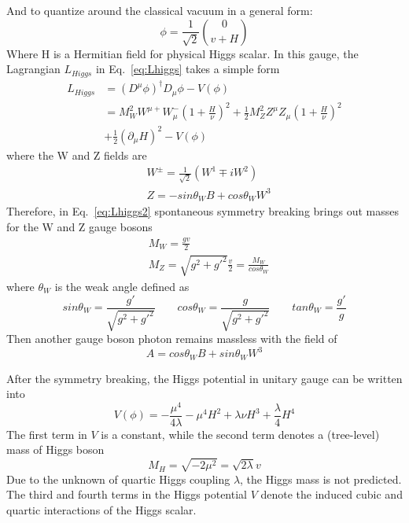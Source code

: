 And to quantize around the classical vacuum in a general form:
\begin{equation}
	\phi = \frac{1}{\sqrt{2}} \binom{0}{v+H}
\end{equation}
Where H is a Hermitian field for physical Higgs scalar.
In this gauge, the Lagrangian $L_{Higgs}$ in Eq.~\ref{eq:Lhiggs} takes a simple form
\begin{equation}
\begin{split} \label{eq:Lhiggs2}
	L_{Higgs} & = \left(D^{\mu}\phi\right)^{\dagger}D_{\mu}\phi - V(\phi) \\
	& = M_{W}^{2}W^{\mu+}W_{\mu}^{-}\left(1+\frac{H}{\nu}\right)^{2} + \frac{1}{2}M_{Z}^{2}Z^{\mu}Z_{\mu}\left(1+\frac{H}{\nu}\right)^{2} \\ 
        &   + \frac{1}{2}\left(\partial_{\mu}H\right)^{2} - V(\phi)
\end{split}
\end{equation}
where the W and Z fields are
\begin{equation}
\begin{split}
	& W^{\pm} = \frac{1}{\sqrt{2}} \left(W^{1} \mp iW^{2}\right) \\
	& Z = - sin\theta_{W}B + cos\theta_{W}W^{3}
\end{split}
\end{equation}
Therefore, in Eq.~\ref{eq:Lhiggs2} spontaneous symmetry breaking brings out masses for the W and Z gauge bosons
\begin{equation}
\begin{split}
	& M_{W} = \frac{gv}{2} \\
	& M_{Z} = \sqrt{g^{2} + g'^{2}} \frac{v}{2} = \frac{M_{W}}{cos\theta_{W}}
\end{split}
\end{equation}
where $\theta_{W}$ is the weak angle defined as
\begin{equation}
	sin\theta_{W} = \frac{g'}{\sqrt{g^{2} + g'^{2}}} \qquad cos\theta_{W} = \frac{g}{\sqrt{g^{2} + g'^{2}}} \qquad tan\theta_{W} = \frac{g'}{g}
\end{equation}
Then another gauge boson photon remains massless with the field of
\begin{equation}
	A = cos\theta_{W}B + sin\theta_{W}W^{3}
\end{equation}

After the symmetry breaking, the Higgs potential in unitary gauge can be written into
\begin{equation}
	V(\phi) = -\frac{\mu^{4}}{4\lambda} - \mu^{4}H^{2} + \lambda\nu H^{3} + \frac{\lambda}{4}H^{4}
\end{equation}
The first term in $V$ is a constant, while the second term denotes a (tree-level) mass of Higgs boson
\begin{equation}
	M_{H} = \sqrt{-2\mu^{2}} = \sqrt{2\lambda}v
\end{equation}
Due to the unknown of quartic Higgs coupling $\lambda$, the Higgs mass is not predicted.
The third and fourth terms in the Higgs potential $V$ denote the induced cubic and quartic interactions of the Higgs scalar.

